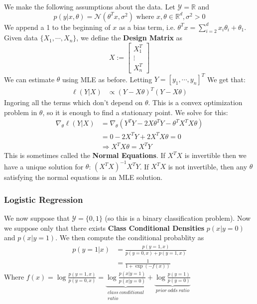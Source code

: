 \documentclass[]{article}
\theoremstyle{mattstyle}
\theoremstyle{definition}
\begin{document}
We make the following assumptions about the data. Let $\mathcal{Y} = \mathbb{R}$ and $$p(y|x, \theta) =\mathcal{N}(\theta^Tx,\sigma^2) \text{ where } x,\theta \in \mathbb{R}^d, \sigma^2 >0$$
We append a 1 to the beginning of $x$ as a bias term, i.e. $\theta^Tx = \sum_{i=2}^{d}x_i\theta_i + \theta_1$.
Given data $\{X_1, \cdots, X_n\}$, we define the \textbf{Design Matrix} as $$X:=\begin{bmatrix}
X_1^T \\
\vdots \\
X_n^T
\end{bmatrix}$$
We can estimate $\theta$ using MLE as before. Letting $Y=[y_1, \cdots, y_n]^T$ We get that:
\begin{align*}
\ell(Y | X) &\propto (Y - X\theta)^T(Y - X\theta)
\end{align*}
Ingoring all the terms which don't depend on $\theta$. This is a convex optimization problem in $\theta$, so it is enough to find a stationary point. We solve for this:
\begin{align*}
\nabla_{\theta} \ell(Y | X) &= \nabla_{\theta}\left( Y^TY - 2X\theta^TY - \theta^TX^TX\theta \right)\\
&= 0 - 2X^TY + 2X^TX\theta = 0\\
&\Rightarrow X^TX\theta = X^TY
\end{align*}
This is sometimes called the \textbf{Normal Equations}. If $X^TX$ is invertible then we have a unique solution for $\theta$: $ (X^TX)^{-1}X^TY$. If $X^TX$ is not invertible, then any $\theta$ satisfying the normal equations is an MLE solution.

\subsubsection{Logistic Regression}

We now suppose that $\mathcal{Y} = \{0,1\}$ (so this is a binary classification problem). Now we suppose only that there exists \textbf{Class Conditional Densities} $p(x|y=0)$ and $p(x|y=1)$. We then compute the conditional probablity as
\begin{align*}
p(y=1|x) &= \frac{p(y=1, x)}{p(y=0, x)+p(y=1, x)}\\
&= \frac{1}{1+\exp(-f(x))}
\end{align*}
Where $f(x)=\log\frac{p(y=1, x)}{p(y=0, x)}=\underbrace{\log\frac{p(x|y=1)}{p(x|y=0)}}_{\substack{class \ conditional \\ ratio}} + \underbrace{\log\frac{p(y=1)}{p(y=0)}}_{prior \ odds \ ratio}$
\end{document}
